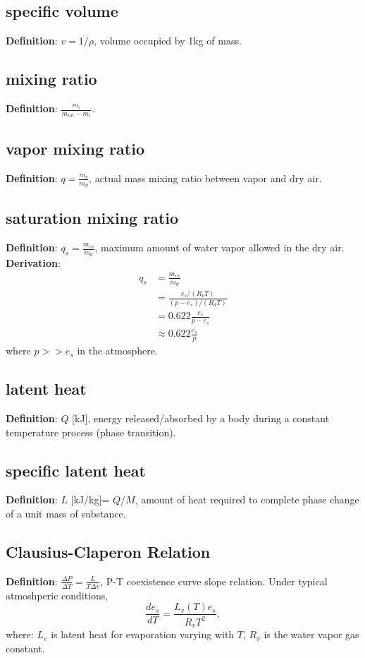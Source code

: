 \subsection{specific volume}
{\bf Definition}: $v = 1/\rho$, volume occupied by 1kg of mass.

\subsection{mixing ratio}
{\bf Definition}: $ \frac{m_i}{m_{\text{tot}}-m_i} $.

\subsection{vapor mixing ratio}
{\bf Definition}: $ q = \frac{m_v}{m_d}$, actual mass mixing ratio between vapor and dry air.

\subsection{saturation mixing ratio}
{\bf Definition}: $ q_s = \frac{m_{vs}}{m_d}$, maximum amount of water vapor allowed in the dry air.
\\
{\bf Derivation}: 
\begin{equation}
\begin{aligned}
   q_s & = \frac{m_{vs}}{m_d} \\
       & = \frac{e_s/(R_v T)}{(p-e_s)/(R_dT)} \\
       & = 0.622\frac{e_s}{p-e_s} \\
       & \approx 0.622\frac{e_s}{p}
\end{aligned}
\end{equation}
where $p >> e_s$ in the atmosphere.

\subsection{latent heat}
{\bf Definition}: $Q$ [kJ], energy released/absorbed by a body during a constant temperature process
(phase transition).

\subsection{specific latent heat}
{\bf Definition}: $L$ [kJ/kg]= $Q/M$, amount of heat required to complete phase change of a unit
mass of substance.

\subsection{Clausius-Claperon Relation}
{\bf Definition}: $\frac{\Delta P}{\Delta T} = \frac{L}{T\Delta v}$, P-T coexistence curve slope
relation. Under typical atmoshperic conditions, 
\begin{equation}
   \frac{d e_s}{dT} = \frac{L_v(T)e_s}{R_vT^2}, 
\end{equation}
where: $L_v$ is latent heat for evaporation varying with $T$, $R_v$ is the water vapor gas constant.
\\


